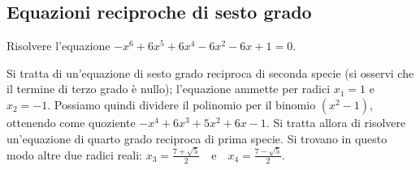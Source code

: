 \subsection{Equazioni reciproche di sesto grado}
\begin{exrig}
 \begin{esempio}
 Risolvere l'equazione $-x^6+6x^5+6x^4-6x^2-6x+1=0$.

 Si tratta di un'equazione di sesto grado reciproca di seconda specie (si osservi che il termine di terzo grado è nullo); l'equazione ammette per radici $x_1=1$ e $x_2=-1$.
Possiamo quindi dividere il polinomio per il binomio $\left(x^2-1\right)$, ottenendo come quoziente $-x^4+6x^3+5x^2+6x-1$. Si tratta allora di risolvere un'equazione di quarto grado reciproca di prima specie. Si trovano in questo modo altre due radici reali: $x_3=\frac{7+\sqrt 5}{2}$~~e~~$x_4=\frac{7-\sqrt 5} 2$.
 \end{esempio}
\end{exrig}
\newpage

\cleardoublepage
